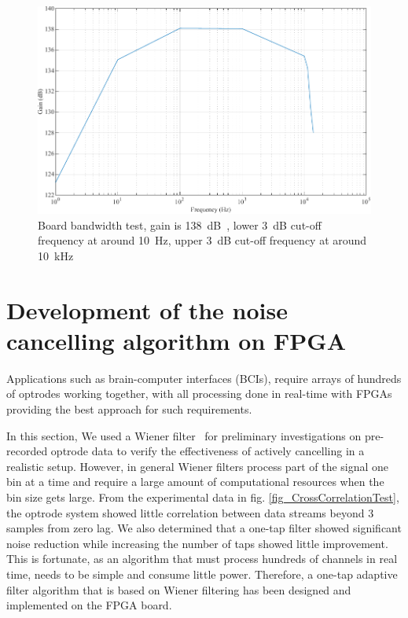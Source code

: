 \begin{figure}[H]
\centering
\includegraphics[width=1\linewidth]{4-ANC_Sys/BoardBandwidth.pdf}
\caption{Board bandwidth test, gain is \qty{138}{dB\Omega}, lower \qty{3}{dB} cut-off frequency at around \qty{10}{Hz}, upper \qty{3}{dB} cut-off frequency at around \qty{10}{kHz}}
\label{fig_BoardBandwidth}
\end{figure}




\section{Development of the noise cancelling algorithm on FPGA}

Applications such as brain-computer interfaces (BCIs), require arrays of hundreds of optrodes working together, with all processing done in real-time with FPGAs providing the best approach for such requirements.

In this section, We used a Wiener filter~\cite{WienerFilter} for preliminary investigations on pre-recorded optrode data to verify the effectiveness of actively cancelling in a realistic setup. However, in general Wiener filters process part of the signal one bin at a time and require a large amount of computational resources when the bin size gets large.  From the experimental data in fig. \ref{fig_CrossCorrelationTest}, the optrode system showed little correlation between data streams beyond 3 samples from zero lag. We also determined that a one-tap filter showed significant noise reduction while increasing the number of taps showed little improvement.  This is fortunate, as an algorithm that must process hundreds of channels in real time, needs to be simple and consume little power.  Therefore, a one-tap adaptive filter algorithm that is based on Wiener filtering has been designed and implemented on the FPGA board.


